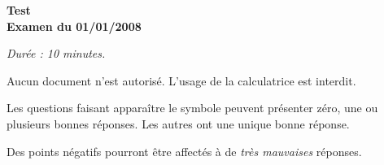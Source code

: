 

\vspace*{.5cm}
\begin{minipage}{.4\linewidth}

\centering\large\bf Test\\ Examen du 01/01/2008\end{minipage}

         
\hspace*{\fill}
\hspace*{\fill}

\begin{center}\em
Durée : 10 minutes.

  Aucun document n'est autorisé.
  L'usage de la calculatrice est interdit.

  Les questions faisant apparaître le symbole \multiSymbole{} peuvent
  présenter zéro, une ou plusieurs bonnes réponses. Les autres ont
  une unique bonne réponse.

  Des points négatifs pourront être affectés à de \emph{très
    mauvaises} réponses.
\end{center}
\vspace{1ex}

